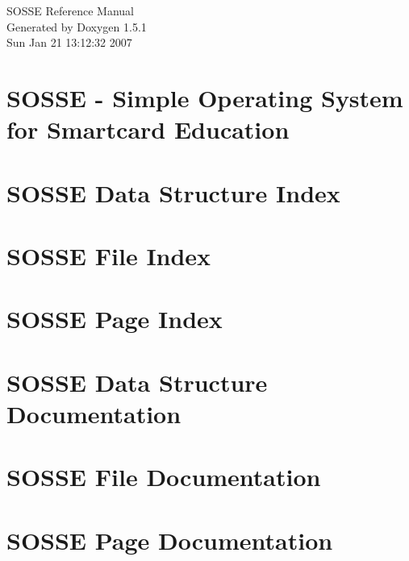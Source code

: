 \documentclass[a4paper]{article}
\begin{document}
\begin{titlepage}
\vspace*{7cm}
\begin{center}
{\Large SOSSE Reference Manual}\\
\vspace*{1cm}
{\large Generated by Doxygen 1.5.1}\\
\vspace*{0.5cm}
{\small Sun Jan 21 13:12:32 2007}\\
\end{center}
\end{titlepage}
\tableofcontents
{}
\section{SOSSE - Simple Operating System for Smartcard Education }
\label{index}
\section{SOSSE Data Structure Index}

\section{SOSSE File Index}

\section{SOSSE Page Index}

\section{SOSSE Data Structure Documentation}



\section{SOSSE File Documentation}




































\section{SOSSE Page Documentation}

\printindex
\end{document}
